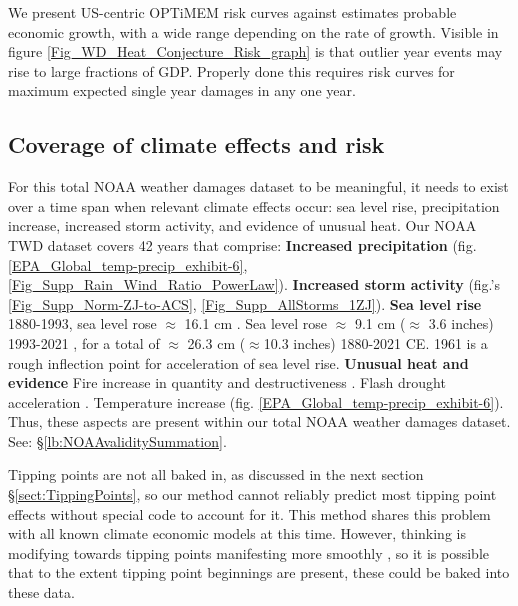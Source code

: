 \documentclass{article}
\begin{document}
We present US-centric OPTiMEM risk curves against estimates probable economic growth,  with a wide range depending on the rate of growth. Visible in figure \ref{Fig_WD_Heat_Conjecture_Risk_graph} is that outlier year events may rise to large fractions of GDP. Properly done this requires risk curves for maximum expected single year damages in any one year. 

\subsection{Coverage of climate effects and risk}
For this total NOAA weather damages dataset to be meaningful, it needs to exist over a time span when relevant climate effects occur: sea level rise, precipitation increase, increased storm activity, and evidence of unusual heat. 
Our NOAA TWD dataset covers 42 years that comprise: \textbf{Increased precipitation} \cite{Ayat2022Subhourlyrainintensity,EPA2022GlobalMeanTempPrecip} (fig. \ref{EPA_Global_temp-precip_exhibit-6}, \ref{Fig_Supp_Rain_Wind_Ratio_PowerLaw}). \textbf{Increased storm activity} \cite{hurdat2-1851-2021-041922} (fig.'s \ref{Fig_Supp_Norm-ZJ-to-ACS}, \ref{Fig_Supp_AllStorms_1ZJ}). \textbf{Sea level rise} 1880-1993, sea level rose $\approx$ 16.1 cm \cite{Church2011SeaLevelRiseLate19th_Early21stCentury}. Sea level rose $\approx$ 9.1 cm ($\approx$ 3.6 inches) 1993-2021 \cite{NASA_GSFC2021GlobalMeanSeaLevelTrend}, for a total of $\approx$ 26.3 cm ($\approx$10.3 inches) 1880-2021 CE.  1961 is a rough inflection point for acceleration of sea level rise. \textbf{Unusual heat and evidence} Fire increase in quantity and destructiveness \cite{Zheng2023RecorodBorealCO2,Jones2024GlobalRiseInForestFire_ClimateChangeInExtratropics,Balch2024Fastest_most_destructive_fires2001to2020,Higuerae2021ForestsBurnGT2000yr}. Flash drought acceleration \cite{Yuan2023FlashDroughtsClimateChange}. Temperature increase (fig. \ref{EPA_Global_temp-precip_exhibit-6}). Thus, these aspects are present within our total NOAA weather damages dataset. See: \S \ref{lb:NOAAvaliditySummation}.

Tipping points are not all baked in, as discussed in the next section \S \ref{sect:TippingPoints}, so our method cannot reliably predict most tipping point effects without special code to account for it. This method shares this problem with all known climate economic models at this time. However, thinking is modifying towards tipping points manifesting more smoothly \cite{Lenton2021TippingClimateSystem}, so it is possible that to the extent tipping point beginnings are present, these could be baked into these data. 
\end{document}
